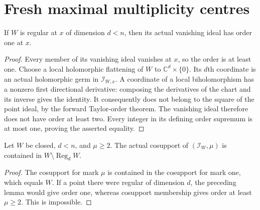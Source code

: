 \section{Fresh maximal multiplicity centres}

\begin{lemma}
\label{hir:reduced-ideal-order-one-regular}
\leanok
If $W$ is regular at $x$ of dimension $d<n$, then its actual vanishing
ideal has order one at $x$.
\end{lemma}
\begin{proof}
Every member of its vanishing ideal vanishes at $x$, so the order is at
least one. Choose a local holomorphic flattening of $W$ to
$\mathbb C^d\times\{0\}$. Its $d$th coordinate is an actual holomorphic
germ in $\mathcal I_{W,x}$. A coordinate of a local biholomorphism has
a nonzero first directional derivative: composing the derivatives of
the chart and its inverse gives the identity. It consequently does not
belong to the square of the point ideal, by the forward Taylor-order
theorem. The vanishing ideal therefore does not have order at least two.
Every integer in its defining order supremum is at most one, proving
the asserted equality.
\end{proof}

\begin{lemma}
\label{hir:high-multiplicity-in-singular-locus}
\leanok
Let $W$ be closed, $d<n$, and $\mu\geq2$. The actual cosupport of
$(\mathcal I_W,\mu)$ is contained in $W\setminus\operatorname{Reg}_d W$.
\end{lemma}
\begin{proof}
The cosupport for mark $\mu$ is contained in the cosupport for mark one,
which equals $W$. If a point there were regular of dimension $d$, the
preceding lemma would give order one, whereas cosupport membership gives
order at least $\mu\geq2$. This is impossible.
\end{proof}

